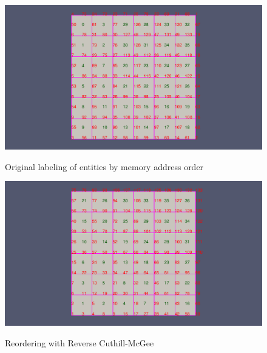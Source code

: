 \documentclass{article}
\begin{document}
\begin{figure}[ht]
\caption{Original labeling of entities by memory address order}
{\includegraphics[width = 15cm ]{pre_a}}
\centering
\end{figure}

\begin{figure}[h]
\caption{Reordering with Reverse Cuthill-McGee}
{\includegraphics[width = 15cm ]{post_a}}
\centering
\end{figure}
\end{document}
